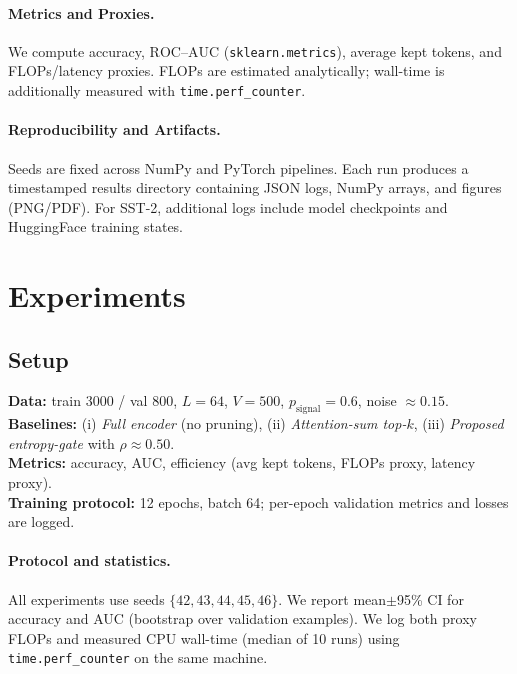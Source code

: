 \documentclass{article}
\newcommand{\keep}{0.50}         %
\newcommand{\Lseq}{L}
\begin{document}
\paragraph{Metrics and Proxies.}
We compute accuracy, $\mathrm{ROC}$--$\mathrm{AUC}$
 (\texttt{sklearn.metrics}), average kept tokens, and FLOPs/latency proxies. FLOPs are estimated analytically; wall-time is additionally measured with \texttt{time.perf_counter}.

\paragraph{Reproducibility and Artifacts.}
Seeds are fixed across NumPy and PyTorch pipelines. Each run produces a timestamped results directory containing JSON logs, NumPy arrays, and figures (PNG/PDF). For SST-2, additional logs include model checkpoints and HuggingFace training states.

\section{Experiments}
\label{sec:expts}
\subsection{Setup}
\textbf{Data:} train 3000 / val 800, $\Lseq{=}64$, $V{=}500$, $p_{\text{signal}}{=}0.6$, noise $\approx 0.15$. \\
\textbf{Baselines:} (i) \emph{Full encoder} (no pruning), (ii) \emph{Attention-sum top-$k$}, (iii) \emph{Proposed entropy-gate} with $\rho{\approx}\keep$. \\
\textbf{Metrics:} accuracy, AUC, efficiency (avg kept tokens, FLOPs proxy, latency proxy). \\
\textbf{Training protocol:} 12 epochs, batch 64; per-epoch validation metrics and losses are logged.

\paragraph{Protocol and statistics.}
All experiments use seeds $\{42,43,44,45,46\}$. We report mean$\pm$95\% CI for accuracy and AUC (bootstrap over validation examples). We log both proxy FLOPs and measured CPU wall-time (median of 10 runs) using \texttt{time.perf_counter} on the same machine.
\end{document}
